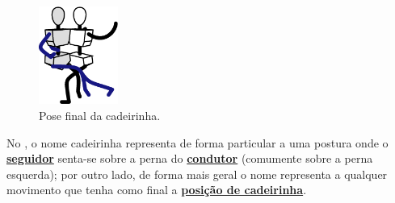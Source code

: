 \begin{figure}
  \vspace{-10pt}
  \centering
    \includegraphics[width=0.23\textwidth]{chapters/cap-historia-passos/cadeirinha.eps}
  \caption{Pose final da  cadeirinha.}
  \label{fig:cadeirinhastickman}
  \vspace{-10pt}
\end{figure}
No \AnoLivro, o nome cadeirinha representa de forma particular a uma postura onde o \hyperref[def:Seguidor]{\textbf{seguidor}} 
senta-se sobre a perna do \hyperref[def:Condutor]{\textbf{condutor}}  (comumente sobre a perna esquerda);
por outro lado, de forma mais geral  o nome representa a qualquer movimento que tenha como final a 
\hyperref[def:cadeirinha-position]{\textbf{posição de cadeirinha}}.


